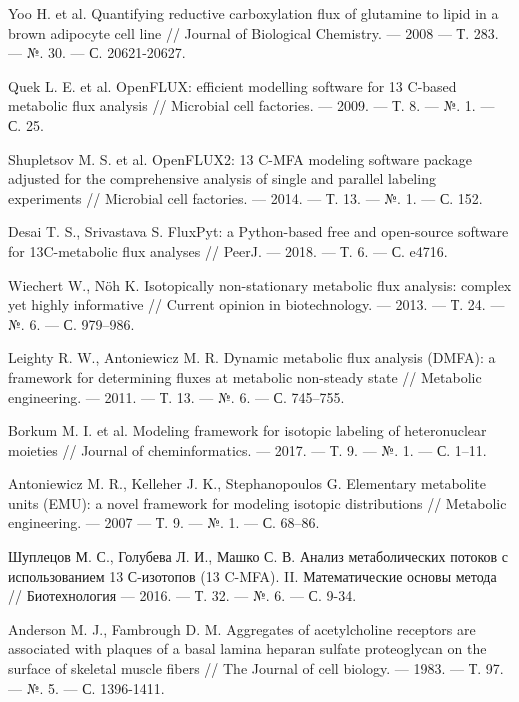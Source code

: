 \documentclass[14pt, a4paper]{extreport}
\begin{document}
\begin{thebibliography}{XXXX}
	Yoo H. et al. Quantifying reductive carboxylation flux of glutamine to lipid in a brown adipocyte cell line // Journal of Biological Chemistry. --- 2008 --- Т. 283. --- №. 30. --- С. 20621-20627.
	
	Quek L. E. et al. OpenFLUX: efficient modelling software for 13 C-based metabolic flux analysis // Microbial cell factories. --- 2009. --- Т. 8. --- №. 1. --- С. 25.
	
	Shupletsov M. S. et al. OpenFLUX2: 13 C-MFA modeling software package adjusted for the comprehensive analysis of single and parallel labeling experiments // Microbial cell factories. --- 2014. --- Т. 13. --- №. 1. --- С. 152.
	
	Desai T. S., Srivastava S. FluxPyt: a Python-based free and open-source software for 13C-metabolic flux analyses // PeerJ. --- 2018. --- Т. 6. --- С. e4716.
	
	Wiechert W., Nöh K. Isotopically non-stationary metabolic flux analysis: complex yet highly informative // Current opinion in biotechnology. --- 2013. --- Т. 24. --- №. 6. --- С. 979--986.
	
	Leighty R. W., Antoniewicz M. R. Dynamic metabolic flux analysis (DMFA): a framework for determining fluxes at metabolic non-steady state // Metabolic engineering. --- 2011. --- Т. 13. --- №. 6. --- С. 745--755.

	Borkum M. I. et al. Modeling framework for isotopic labeling of heteronuclear moieties // Journal of cheminformatics. --- 2017. --- Т. 9. --- №. 1. --- С. 1--11.
	
	Antoniewicz M. R., Kelleher J. K., Stephanopoulos G. Elementary metabolite units (EMU): a novel framework for modeling isotopic distributions // Metabolic engineering. --- 2007 --- Т. 9. --- №. 1. --- С. 68--86.
	
	Шуплецов М. С., Голубева Л. И., Машко С. В. Анализ метаболических потоков с использованием 13 С-изотопов (13 C-MFA). II. Математические основы метода // Биотехнология --- 2016. --- Т. 32. --- №. 6. --- С. 9-34.
	
	Anderson M. J., Fambrough D. M. Aggregates of acetylcholine receptors are associated with plaques of a basal lamina heparan sulfate proteoglycan on the surface of skeletal muscle fibers // The Journal of cell biology. --- 1983. --- Т. 97. --- №. 5. --- С. 1396-1411.
	
	
\end{thebibliography}
\end{document}
